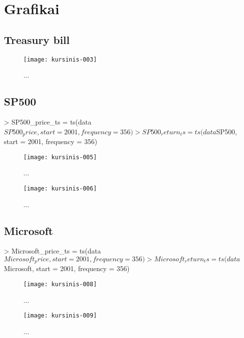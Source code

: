 \documentclass[12pt, a14paper, lithuanian]{article}
\begin{document}
  

\section{Grafikai}
\subsection{Treasury bill}
\begin{Schunk}
\end{Schunk}
\begin{figure}[H]
  \centering
\texttt{[image: kursinis-003]}
  \caption{...}
  \label{fig:1}
\end{figure}
           

\subsection{SP500}
\begin{Schunk}
\begin{Sinput}
> SP500_price_ts = ts(data$SP500_price, start = 2001, frequency = 356)
> SP500_return_ts = ts(data$SP500, start = 2001, frequency = 356)
\end{Sinput}
\end{Schunk}
\begin{figure}[H]
  \centering
\texttt{[image: kursinis-005]}
  \caption{...}
  \label{fig:2}
\end{figure}
\begin{figure}[H]
  \centering
\texttt{[image: kursinis-006]}
  \caption{...}
  \label{fig:3}
\end{figure}
             

\subsection{Microsoft}
\begin{Schunk}
\begin{Sinput}
> Microsoft_price_ts = ts(data$Microsoft_price, start = 2001, frequency = 356)
> Microsoft_return_ts = ts(data$Microsoft, start = 2001, frequency = 356)
\end{Sinput}
\end{Schunk}
\begin{figure}[H]
  \centering
\texttt{[image: kursinis-008]}
  \caption{...}
  \label{fig:4}
\end{figure}
\begin{figure}[H]
  \centering
\texttt{[image: kursinis-009]}
  \caption{...}
  \label{fig:5}
\end{figure}
             
\end{document}
